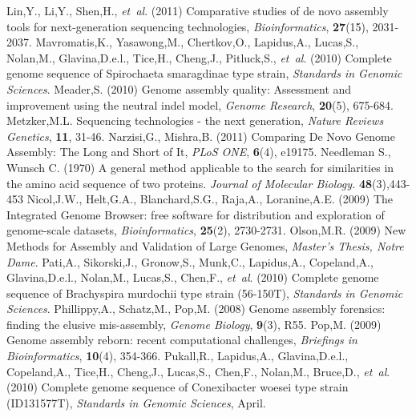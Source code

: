 \begin{thebibliography}{}
 Lin,Y., Li,Y., Shen,H., {\it et~al}. (2011) Comparative studies of de novo assembly tools for next-generation sequencing technologies, {\it Bioinformatics}, {\bf 27}(15), 2031-2037.
 Mavromatis,K., Yasawong,M., Chertkov,O., Lapidus,A., Lucas,S., Nolan,M., Glavina,D.e.l., Tice,H., Cheng,J., Pitluck,S., {\it et~al}. (2010) Complete genome sequence of Spirochaeta smaragdinae type strain, {\it Standards in Genomic Sciences}.
 Meader,S. (2010) Genome assembly quality: Assessment and improvement using the neutral indel model, {\it Genome Research}, {\bf 20}(5), 675-684.
 Metzker,M.L. Sequencing technologies - the next generation, {\it Nature Reviews Genetics}, {\bf 11}, 31-46.
 Narzisi,G., Mishra,B. (2011) Comparing De Novo Genome Assembly: The Long and Short of It, {\it PLoS ONE}, {\bf 6}(4), e19175.
    Needleman S., Wunsch C. (1970) A general method applicable to the search for similarities in the amino acid sequence of two proteins.
    \textit{Journal of Molecular Biology.} \textbf{48}(3),443-453
 Nicol,J.W., Helt,G.A., Blanchard,S.G., Raja,A., Loranine,A.E. (2009) The Integrated Genome Browser: free software for distribution and exploration of genome-scale datasets, {\it Bioinformatics}, {\bf 25}(2), 2730-2731.
 Olson,M.R. (2009) New Methods for Assembly and Validation of Large Genomes, {\it Master's Thesis, Notre Dame}.
 Pati,A., Sikorski,J., Gronow,S., Munk,C., Lapidus,A., Copeland,A., Glavina,D.e.l., Nolan,M., Lucas,S., Chen,F., {\it et~al}. (2010) Complete genome sequence of Brachyspira murdochii type strain (56-150T), {\it Standards in Genomic Sciences}.
 Phillippy,A., Schatz,M., Pop,M. (2008) Genome assembly forensics: finding the elusive mis-assembly, {\it Genome Biology}, {\bf 9}(3), R55.
 Pop,M. (2009) Genome assembly reborn: recent computational challenges, {\it Briefings in Bioinformatics}, {\bf 10}(4), 354-366.
 Pukall,R., Lapidus,A., Glavina,D.e.l., Copeland,A., Tice,H., Cheng,J., Lucas,S., Chen,F., Nolan,M., Bruce,D., {\it et~al}. (2010) Complete genome sequence of Conexibacter woesei type strain (ID131577T), {\it Standards in Genomic Sciences}, April.

\end{thebibliography}

